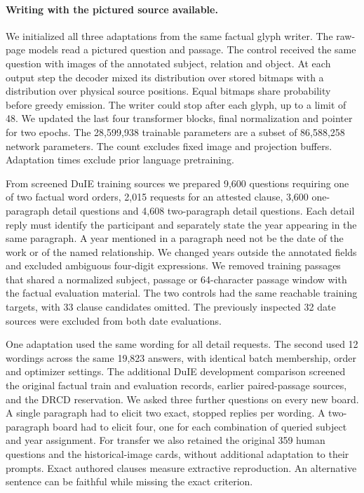\documentclass[12pt,a4paper]{article}
\providecommand{\DIFadd}[1]{{\protect\color{blue} \sf #1}} %
\begin{document}
\paragraph{\DIFadd{Writing with the pictured source available.}}
\DIFadd{We initialized all three adaptations from the same factual glyph writer. The raw-page models read a pictured question and passage. The control received the same question with images of the annotated subject, relation and object. At each output step the decoder mixed its distribution over stored bitmaps with a distribution over physical source positions. Equal bitmaps share probability before greedy emission. The writer could stop after each glyph, up to a limit of 48. We updated the last four transformer blocks, final normalization and pointer for two epochs. The 28,599,938 trainable parameters are a subset of 86,588,258 network parameters. The count excludes fixed image and projection buffers. Adaptation times exclude prior language pretraining.
}

\DIFadd{From screened DuIE training sources we prepared 9,600 questions requiring one of two factual word orders, 2,015 requests for an attested clause, 3,600 one-paragraph detail questions and 4,608 two-paragraph detail questions. Each detail reply must identify the participant and separately state the year appearing in the same paragraph. A year mentioned in a paragraph need not be the date of the work or of the named relationship. We changed years outside the annotated fields and excluded ambiguous four-digit expressions. We removed training passages that shared a normalized subject, passage or 64-character passage window with the factual evaluation material. The two controls had the same reachable training targets, with 33 clause candidates omitted. The previously inspected 32 date sources were excluded from both date evaluations.
}

\DIFadd{One adaptation used the same wording for all detail requests. The second used 12 wordings across the same 19,823 answers, with identical batch membership, order and optimizer settings. The additional DuIE development comparison screened the original factual train and evaluation records, earlier paired-passage sources, and the DRCD reservation. We asked three further questions on every new board. A single paragraph had to elicit two exact, stopped replies per wording. A two-paragraph board had to elicit four, one for each combination of queried subject and year assignment. For transfer we also retained the original 359 human questions and the historical-image cards, without additional adaptation to their prompts. Exact authored clauses measure extractive reproduction. An alternative sentence can be faithful while missing the exact criterion.
}
\end{document}
